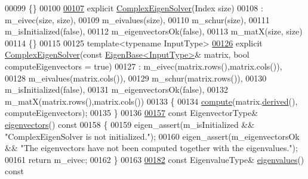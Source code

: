 \begin{DoxyCode}
00099     \{\}
00100 
\hyperlink{group___eigenvalues___module_a86751f64ebcd5c554551fb5eaaa02db7}{00107}     \textcolor{keyword}{explicit} \hyperlink{group___eigenvalues___module_a86751f64ebcd5c554551fb5eaaa02db7}{ComplexEigenSolver}(Index size)
00108             : m\_eivec(size, size),
00109               m\_eivalues(size),
00110               m\_schur(size),
00111               m\_isInitialized(false),
00112               m\_eigenvectorsOk(false),
00113               m\_matX(size, size)
00114     \{\}
00115 
00125     \textcolor{keyword}{template}<\textcolor{keyword}{typename} InputType>
\hyperlink{group___eigenvalues___module_a748de5c1e7f730e16421e6d451437600}{00126}     \textcolor{keyword}{explicit} \hyperlink{group___eigenvalues___module_a748de5c1e7f730e16421e6d451437600}{ComplexEigenSolver}(\textcolor{keyword}{const} \hyperlink{group___core___module_struct_eigen_1_1_eigen_base}{EigenBase<InputType>}& matrix, \textcolor{keywordtype}{
      bool} computeEigenvectors = \textcolor{keyword}{true})
00127             : m\_eivec(matrix.rows(),matrix.cols()),
00128               m\_eivalues(matrix.cols()),
00129               m\_schur(matrix.rows()),
00130               m\_isInitialized(false),
00131               m\_eigenvectorsOk(false),
00132               m\_matX(matrix.rows(),matrix.cols())
00133     \{
00134       \hyperlink{group___eigenvalues___module_aeb7e38c6db5369f5c974f3786e94c1f0}{compute}(matrix.\hyperlink{group___core___module_a324b16961a11d2ecfd2d1b7dd7946545}{derived}(), computeEigenvectors);
00135     \}
00136 
\hyperlink{group___eigenvalues___module_a3aa5e27800349990778da8fa532c1270}{00157}     \textcolor{keyword}{const} EigenvectorType& \hyperlink{group___eigenvalues___module_a3aa5e27800349990778da8fa532c1270}{eigenvectors}()\textcolor{keyword}{ const}
00158 \textcolor{keyword}{    }\{
00159       eigen\_assert(m\_isInitialized && \textcolor{stringliteral}{"ComplexEigenSolver is not initialized."});
00160       eigen\_assert(m\_eigenvectorsOk && \textcolor{stringliteral}{"The eigenvectors have not been computed together with the
       eigenvalues."});
00161       \textcolor{keywordflow}{return} m\_eivec;
00162     \}
00163 
\hyperlink{group___eigenvalues___module_a10c25c7620e7faedcd39991cce3a757b}{00182}     \textcolor{keyword}{const} EigenvalueType& \hyperlink{group___eigenvalues___module_a10c25c7620e7faedcd39991cce3a757b}{eigenvalues}()\textcolor{keyword}{ const}

\end{DoxyCode}
